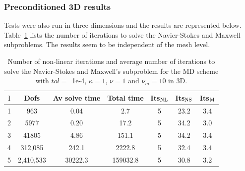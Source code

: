 \subsubsection{Preconditioned 3D results}

Tests were also run in three-dimensions and the results are represented below. Table~\ref{tab:MD_3Dlarge_scale} lists the number of iterations to solve the Navier-Stokes and Maxwell subproblems. The results seem to be independent of the mesh level.
\begin{table}[h!] \small
\begin{center}
\begin{tabular}{ccccccc}
\hline
   l&  Dofs &  Av solve time &  Total time &    Its$_{\rm NL}$ &  Its$_{\rm NS}$ &  Its$_{\rm M}$ \\
\hline
1 &    963 &       0.04 &           2.7 &                  5 &        23.2 &        3.4 \\
2 &   5977 &       0.20 &          17.2 &                  5 &        34.2 &        3.0 \\
3 &  41805 &       4.86 &         151.1 &                  5 &        34.2 &        3.4 \\
 4 &  312,085 &     242.1 &        2222.8 &                  5 &        32.4 &        3.4 \\
 5 &  2,410,533 &   30222.3 &      159032.8 &                  5 &        30.8 &        3.2 \\
\hline
\end{tabular}
\caption{Number of non-linear iterations and average number of iterations to solve the Navier-Stokes and Maxwell's subproblem for the MD scheme with $tol=$~1e-4, $\kappa = 1$, $\nu = 1$ and $\nu_m = 10$ in 3D.}
\label{tab:MD_3Dlarge_scale}
\end{center}
\end{table}



